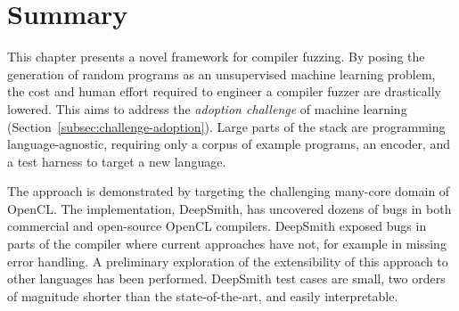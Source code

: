 \section{Summary}
\label{sec:deepsmith-conclusion}

This chapter presents a novel framework for compiler fuzzing. By posing the generation of random programs as an unsupervised machine learning problem, the cost and human effort required to engineer a compiler fuzzer are drastically lowered. This aims to address the \emph{adoption challenge} of machine learning (Section~\ref{subsec:challenge-adoption}). Large parts of the stack are programming language-agnostic, requiring only a corpus of example programs, an encoder, and a test harness to target a new language.

The approach is demonstrated by targeting the challenging many-core domain of OpenCL. The implementation, DeepSmith, has uncovered dozens of bugs in both commercial and open-source OpenCL compilers. DeepSmith exposed bugs in parts of the compiler where current approaches have not, for example in missing error handling. A preliminary exploration of the extensibility of this approach to other languages has been performed. DeepSmith test cases are small, two orders of magnitude shorter than the state-of-the-art, and easily interpretable.
